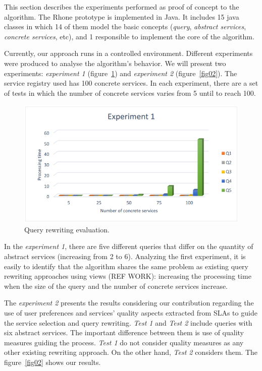This section describes the experiments performed as proof of concept to the algorithm.
The Rhone prototype is implemented in Java.
It includes 15 java classes in which 14 of them model the basic concepts 
(\textit{query}, \textit{abstract services}, \textit{concrete services}, etc), 
and 1 responsible to implement the core of the algorithm. 

Currently, our approach runs in a controlled environment. 
Different experiments were produced to analyse the algorithm's behavior.
We will present two experiments: \textit{experiment 1}
(figure~\ref{fig01}) and \textit{experiment 2} (figure~\ref{fig02}).
The service registry used has 100 concrete services. 
In each experiment, there are a set of tests in which the number of concrete 
services varies from 5 until to reach 100.

\begin{figure}[!h]
\centering
\includegraphics[scale=0.4]{exp1.png}
\caption{Query rewriting evaluation.}\label{fig01}
\end{figure} 

In the \textit{experiment 1}, there are five different queries that differ on
the quantity of abstract services (increasing from 2 to 6). Analyzing the first
experiment, it is easily to identify that the algorithm shares the same problem
as existing query rewriting approaches using views (REF WORK): increasing the
processing time when the size of the query and the number of concrete services increase.


The \textit{experiment 2} presents the results considering our contribution regarding the use of user preferences and services' quality aspects extracted from SLAs to guide the service selection and query rewriting.
\textit{Test 1} and \textit{Test 2} include queries with six abstract services. 
The important difference between them is use of quality measures guiding the process. \textit{Test 1} do not consider quality measures as any other existing rewriting approach. On the other hand, \textit{Test 2} considers them.
The figure~\ref{fig02} shows our results. 

